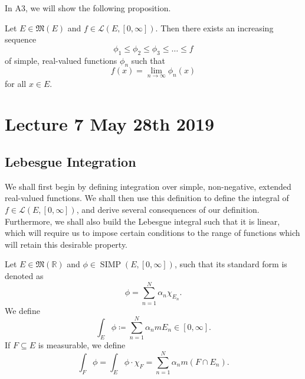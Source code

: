 \documentclass[notoc,notitlepage]{tufte-book}
\DeclareMathOperator{\SIMP}{SIMP}
\begin{document}
In A3, we will show the following proposition.

\begin{propo}\label{propo:increasing_sequence_of_simple_functions_that_converges_to_a_measurable_function}
  Let $E \in \mathfrak{M}(E)$ and $f \in \mathcal{L}(E, [0, \infty])$. Then
  there exists an increasing sequence
  \begin{equation*}
    \phi_1 \leq \phi_2 \leq \phi_3 \leq \hdots \leq f
  \end{equation*}
  of simple, real-valued functions $\phi_n$ such that
  \begin{equation*}
    f(x) = \lim_{n \to \infty} \phi_n(x)
  \end{equation*}
  for all $x \in E$.
\end{propo}



\chapter{Lecture 7 May 28th 2019}%
\label{chp:lecture_7_may_28th_2019}

\section{Lebesgue Integration}%
\label{sec:lebesgue_integration}

We shall first begin by defining integration over simple, non-negative, extended
real-valued functions. We shall then use this definition to define the integral
of $f \in \mathcal{L}(E, [0, \infty])$, and derive several consequences of our
definition. Furthermore, we shall also build the Lebesgue integral such that it
is linear, which will require us to impose certain conditions to the range of
functions which will retain this desirable property.

\begin{defn}\label{defn:integration_of_simple_functions}
  Let $E \in \mathfrak{M}(\mathbb{R})$ and $\phi \in \SIMP(E, [0, \infty])$,
  such that its standard form is denoted as
  \begin{equation*} 
    \phi = \sum_{n=1}^{N} \alpha_n \chi_{E_n}.
  \end{equation*}
  We define
  \begin{equation*}
    \int_{E} \phi \coloneqq \sum_{n=1}^{N} \alpha_n m E_n \in [0, \infty].
  \end{equation*}
  If $F \subseteq E$ is measurable, we define
  \begin{equation*}
    \int_{F} \phi = \int_{E} \phi \cdot \chi_F = \sum_{n=1}^{N} \alpha_n m(F
    \cap E_n).
  \end{equation*}
\end{defn}
\end{document}
